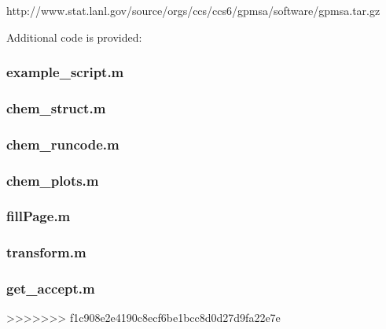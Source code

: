 \documentclass[12pt]{article}
\begin{document}
http://www.stat.lanl.gov/source/orgs/ccs/ccs6/gpmsa/software/gpmsa.tar.gz

Additional code is provided:

\begin{tiny}
\subsubsection*{example\_script.m}


\subsubsection*{chem\_struct.m}


\subsubsection*{chem\_runcode.m}


\subsubsection*{chem\_plots.m}


\subsubsection*{fillPage.m}


\subsubsection*{transform.m}


\subsubsection*{get\_accept.m}

\end{tiny}
>>>>>>> f1c908e2e4190c8ecf6be1bcc8d0d27d9fa22e7e
\end{document}
